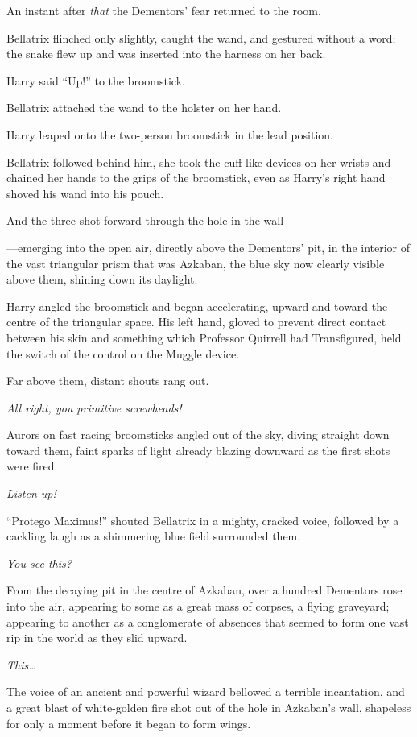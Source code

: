 An instant after \emph{that} the Dementors’ fear returned to the room.

Bellatrix flinched only slightly, caught the wand, and gestured without a word; the snake flew up and was inserted into the harness on her back.

Harry said “Up!” to the broomstick.

Bellatrix attached the wand to the holster on her hand.

Harry leaped onto the two-person broomstick in the lead position.

Bellatrix followed behind him, she took the cuff-like devices on her wrists and chained her hands to the grips of the broomstick, even as Harry’s right hand shoved his wand into his pouch.

And the three shot forward through the hole in the wall—

—emerging into the open air, directly above the Dementors’ pit, in the interior of the vast triangular prism that was Azkaban, the blue sky now clearly visible above them, shining down its daylight.

Harry angled the broomstick and began accelerating, upward and toward the centre of the triangular space. His left hand, gloved to prevent direct contact between his skin and something which Professor Quirrell had Transfigured, held the switch of the control on the Muggle device.

Far above them, distant shouts rang out.

\emph{All right, you primitive screwheads!}

Aurors on fast racing broomsticks angled out of the sky, diving straight down toward them, faint sparks of light already blazing downward as the first shots were fired.

\emph{Listen up!}

“Protego Maximus!” shouted Bellatrix in a mighty, cracked voice, followed by a cackling laugh as a shimmering blue field surrounded them.

\emph{You see this?}

From the decaying pit in the centre of Azkaban, over a hundred Dementors rose into the air, appearing to some as a great mass of corpses, a flying graveyard; appearing to another as a conglomerate of absences that seemed to form one vast rip in the world as they slid upward.

\emph{This…}

The voice of an ancient and powerful wizard bellowed a terrible incantation, and a great blast of white-golden fire shot out of the hole in Azkaban’s wall, shapeless for only a moment before it began to form wings.

